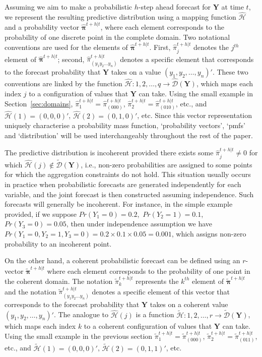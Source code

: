 \documentclass[a4paper,review,12pt,authoryear]{elsarticle}
\newcommand{\bY}{\mathbf{Y}}
\newcommand{\bpi}{\bm{\pi}}
\theoremstyle{definition}
\begin{document}
  Assuming we aim to make a probabilistic $h$-step ahead forecast for $\bY$ at time $t$, we represent the resulting predictive distribution using a mapping function $\hat{\mathcal{H}}$ and a probability vector $\hat{\bpi}^{t+h|t}$, where each element corresponds to the probability of one discrete point in the complete domain.
  Two notational conventions are used for the elements of $\hat{\bpi}^{t+h|t}$.
  First, $\hat{\pi}_j^{t+h|t}$ denotes the $j^{th}$ element of $\hat{\bpi}^{t+h|t}$;
  second, $\hat{\pi}_{(y_1 y_2 \dots y_n)}^{t+h|t}$ denotes a specific element that corresponds to the forecast probability that $\bY$ takes on a value $(y_1,y_2,\dots,y_n)'$. These two conventions are linked by the function $\hat{\mathcal{H}}:{1,2,\dots,q}\rightarrow\hat{\mathcal{D}}(\bY)$, which maps each index $j$ to a configuration of values that $\bY$ can take.
  Using the small example in Section~\ref{sec:domains}, $\hat{\pi}_1^{t+h|t}=\hat{\pi}_{(000)}^{t+h|t}$, $\hat{\pi}_2^{t+h|t}=\hat{\pi}_{(010)}^{t+h|t}$, etc., and $\hat{\mathcal{H}}(1)=(0,0,0)'$, $\hat{\mathcal{H}}(2)=(0,1,0)'$, etc. Since this vector representation uniquely characterise a probability mass function, `probability vectors', `pmfs' and `distribution' will be used interchangeably throughout the rest of the paper.

  The predictive distribution is incoherent provided there exists some $\hat{\pi}^{t+h|t}_j\neq 0$ for which $\hat{\mathcal{H}}(j)\notin\tilde{\mathcal{D}}(\bY)$, i.e., non-zero probabilities are assigned to some points for which the aggregation constraints do not hold.
  This situation usually occurs in practice when probabilistic forecasts are generated independently for each variable, and the joint forecast is then constructed assuming independence.
  Such forecasts will generally be incoherent.
  For instance, in the simple example provided, if we suppose $Pr(Y_1=0)=0.2$,~$Pr(Y_2=1)=0.1$,~$Pr(Y_3=0)=0.05$, then under independence assumption we have $Pr(Y_1=0,Y_2=1,Y_3=0)=0.2\times0.1\times0.05=0.001$, which assigns non-zero probability to an incoherent point.

  On the other hand, a coherent probabilistic forecast can be defined using an $r$-vector $\tilde{\bpi}^{t+h|t}$ where each element corresponds to the probability of one point in the coherent domain.
  The notation $\tilde{\pi}_k^{t+h|t}$ represents the $k^{th}$ element of $\tilde{\bpi}^{t+h|t}$ and the notation $\tilde{\pi}_{(y_1 y_2 \dots y_n)}^{t+h|t}$ denotes a specific element of this vector that corresponds to the forecast probability that $\bY$ takes on a coherent value $(y_1,y_2,\dots,y_n)'$.
  The analogue to $\hat{\mathcal{H}}(j)$ is a function  $\tilde{\mathcal{H}}:{1,2,\dots,r}\rightarrow\tilde{\mathcal{D}}(\bY)$, which maps each index $k$ to a coherent configuration of values that $\bY$ can take.
  Using the small example in the previous section $\tilde{\pi}_1^{t+h|t}=\tilde{\pi}_{(000)}^{t+h|t}$, $\tilde{\pi}_2^{t+h|t}=\tilde{\pi}_{(011)}^{t+h|t}$, etc., and $\tilde{\mathcal{H}}(1)=(0,0,0)'$, $\tilde{\mathcal{H}}(2)=(0,1,1)'$, etc.
\end{document}
